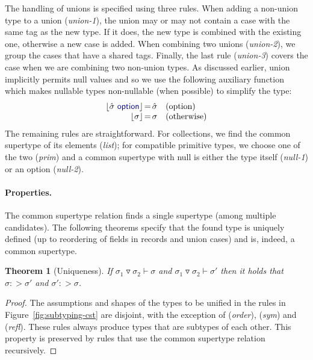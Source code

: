 \documentclass[preprint]{sigplanconf}
\newcommand{\kvd}[1]{\textnormal{\textcolor{kvdclr}{\sffamily #1}}}
\newcommand{\narrow}[1]{\hspace{-0.85em} #1 \hspace{-0.85em}}
\newcommand{\dropopt}[1]{\lfloor#1\rfloor}
\newtheorem{theorem}{Theorem}
\begin{document}
The handling of unions is specified using three rules. When adding a non-union type to a 
union (\emph{union-1}), the union may or may not contain a case with the same tag as the new type.
If it does, the new type is combined with the existing one, otherwise a new case is added.
When combining two unions (\emph{union-2}), we group the cases that have a shared tags.
Finally, the last rule (\emph{union-3}) covers the case when we are combining two non-union types.
As discussed earlier, union implicitly permits \kvd{null} values and so we use the following 
auxiliary function which makes nullable types non-nullable (when possible) to simplify the type:
%
\begin{equation*}
\begin{array}{rcll}
 \dropopt{\hat{\sigma}~\kvd{option}} &\narrow{=}& \hat{\sigma} &(\textnormal{option})\\
 \dropopt{\sigma} &\narrow{=}& \sigma &(\textnormal{otherwise})
\end{array}
\end{equation*}
%
The remaining rules are straightforward. For collections, we find the common supertype of 
its elements (\emph{list}); for compatible primitive types, we choose one of the two (\emph{prim})
and a common supertype with \kvd{null} is either the type itself (\emph{null-1}) or an option 
 (\emph{null-2}).

\paragraph{Properties.}
The common supertype relation finds a single supertype (among multiple candidates).
The following theorems specify that the found type is uniquely defined (up to reordering of 
fields in records and union cases) and is, indeed, a common supertype.
%
\begin{theorem}[Uniqueness]
\raggedright
If $\sigma_1 \triangledown \sigma_2 \vdash \sigma$ and $\sigma_1 \triangledown \sigma_2 \vdash \sigma'$
then it holds that $\sigma :> \sigma'$ and $\sigma' :> \sigma$.
\end{theorem}
\begin{proof}
The assumptions and shapes of the types to be unified in the rules in Figure~\ref{fig:subtyping-cst} 
are disjoint, with the exception of (\emph{order}), (\emph{sym}) and (\emph{refl}). These rules 
always produce types that are subtypes of each other. This property is preserved by rules that use the
common supertype relation recursively.
\end{proof}
\end{document}
